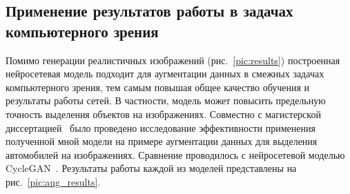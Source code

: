 \documentclass[11pt,a4paper]{extarticle}
\begin{document}
{		\subsection{Применение результатов работы в задачах компьютерного зрения}\label{sec:results:aug}

			Помимо генерации реалистичных изображений (рис.~\ref{pic:results}) построенная нейросетевая модель подходит для аугментации данных в смежных задачах компьютерного зрения, тем самым повышая общее качество обучения и результаты работы сетей.
			В частности, модель может повысить предельную точность выделения объектов на изображениях.
			\newline\newline
			Совместно с магистерской диссертацией~\cite{disser_aug} было проведено исследование эффективности применения полученной мной модели на примере аугментации данных для выделения автомобилей на изображениях.
			Сравнение проводилось с нейросетевой моделью CycleGAN~\cite{CycleGAN}. Результаты работы каждой из моделей представлены на рис.~\ref{pic:aug_results}.

}
\end{document}
